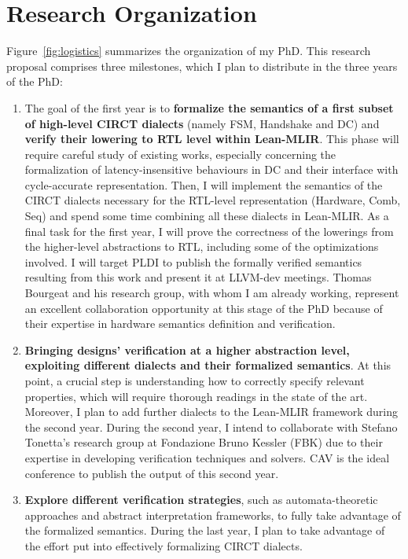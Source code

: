 \documentclass[sigconf,authorversion,nonacm, 11pt]{acmart}
\begin{document}
\section{Research Organization}

Figure~\ref{fig:logistics} summarizes the organization of my PhD.
This research proposal comprises three milestones, which I plan to distribute in the three years of the PhD: 
\begin{enumerate}
    \item The goal of the first year is to \textbf{formalize the semantics of a first subset of high-level CIRCT dialects} (namely FSM, Handshake and DC) and \textbf{verify their lowering to RTL level within Lean-MLIR}.
    This phase will require careful study of existing works, especially concerning the formalization of latency-insensitive behaviours in DC and their interface with cycle-accurate representation. 
    Then, I will implement the semantics of the CIRCT dialects necessary for the RTL-level representation (Hardware, Comb, Seq) and spend some time combining all these dialects in Lean-MLIR. 
    As a final task for the first year, I will prove the correctness of the lowerings from the higher-level abstractions to RTL, including some of the optimizations involved.
    I will target PLDI to publish the formally verified semantics resulting from this work and present it at LLVM-dev meetings.
    Thomas Bourgeat and his research group, with whom I am already working, represent an excellent collaboration opportunity at this stage of the PhD because of their expertise in hardware semantics definition and verification. 
    \item \textbf{Bringing designs' verification at a higher abstraction level, exploiting different dialects and their formalized semantics}. 
    At this point, a crucial step is understanding how to correctly specify relevant properties, which will require thorough readings in the state of the art. 
    Moreover, I plan to add further dialects to the Lean-MLIR framework during the second year. 
    During the second year, I intend to collaborate with Stefano Tonetta's research group at Fondazione Bruno Kessler (FBK) due to their expertise in developing verification techniques and solvers. 
    CAV is the ideal conference to publish the output of this second year.
    \item \textbf{Explore different verification strategies}, such as automata-theoretic approaches and abstract interpretation frameworks, to fully take advantage of the formalized semantics. 
    During the last year, I plan to take advantage of the effort put into effectively formalizing CIRCT dialects. 

\end{enumerate}
\end{document}
